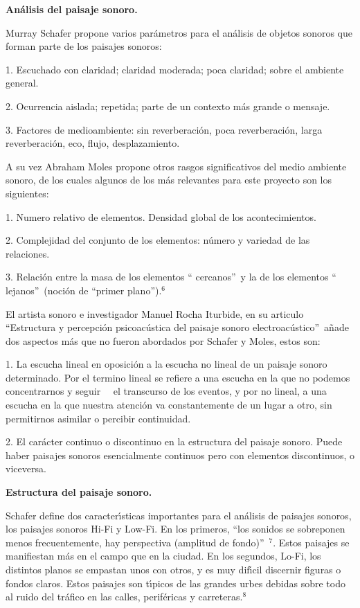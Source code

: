 \textbf{ An\'{a}lisis del paisaje sonoro.}

Murray Schafer propone varios par\'{a}metros para el an\'{a}lisis de objetos
sonoros que forman parte de los paisajes sonoros:

1. Escuchado con claridad; claridad moderada; poca claridad; sobre el
ambiente general.

2. Ocurrencia aislada; repetida; parte de un contexto m\'{a}s grande o
mensaje.

3. Factores de medioambiente: sin reverberaci\'{o}n, poca reverberaci\'{o}n,
larga reverberaci\'{o}n, eco, flujo, desplazamiento.

A su vez Abraham Moles propone otros rasgos significativos del medio
ambiente sonoro, de los cuales algunos de los m\'{a}s relevantes para este
proyecto son los siguientes:

1. Numero relativo de elementos. Densidad global de los acontecimientos.

2. Complejidad del conjunto de los elementos: n\'{u}mero y variedad de las
relaciones.

3. Relaci\'{o}n entre la masa de los elementos \textquotedblleft
cercanos\textquotedblright\ y la de los elementos \textquotedblleft
lejanos\textquotedblright\ (noci\'{o}n de \textquotedblleft primer
plano\textquotedblright).$^{6}$

El artista sonoro e investigador Manuel Rocha Iturbide, en su articulo
\textquotedblleft Estructura y percepci\'{o}n psicoac\'{u}stica del paisaje
sonoro electroac\'{u}stico\textquotedblright\ a\~{n}ade dos aspectos m\'{a}s
que no fueron abordados por Schafer y Moles, estos son:

1. La escucha lineal en oposici\'{o}n a la escucha no lineal de un paisaje
sonoro determinado. Por el termino lineal se refiere a una escucha en la que
no podemos concentrarnos y seguir \qquad\ \ el transcurso de los eventos, y
por no lineal, a una escucha en la que nuestra atenci\'{o}n va
constantemente de un lugar a otro, sin permitirnos asimilar o percibir
continuidad.

2. El car\'{a}cter continuo o discontinuo en la estructura del paisaje
sonoro. Puede haber paisajes sonoros esencialmente continuos pero con
elementos discontinuos, o viceversa.

\textbf{ Estructura del paisaje sonoro.}

Schafer define dos caracter\'{\i}sticas importantes para el an\'{a}lisis de
paisajes sonoros, los paisajes sonoros Hi-Fi y Low-Fi. En los primeros,
\textquotedblleft los sonidos se sobreponen menos frecuentemente, hay
perspectiva (amplitud de fondo)\textquotedblright\ $^{7}$. Estos paisajes se
manifiestan m\'{a}s en el campo que en la ciudad. En los segundos, Lo-Fi,
los distintos planos se empastan unos con otros, y es muy dif\'{\i}cil
discernir figuras o fondos claros. Estos paisajes son t\'{\i}picos de las
grandes urbes debidas sobre todo al ruido del tr\'{a}fico en las calles,
perif\'{e}ricas y carreteras.$^{8}$

